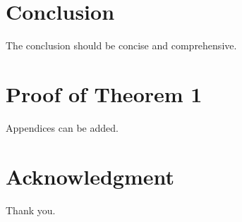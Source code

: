 \documentclass[12pt,oneside,openany]{book}
\begin{document}

\chapter{Conclusion}
The conclusion should be concise and comprehensive.


\appendix
\chapter{Proof of Theorem 1}
Appendices can be added.


\backmatter
\chapter{Acknowledgment}
Thank you.




\end{document}
